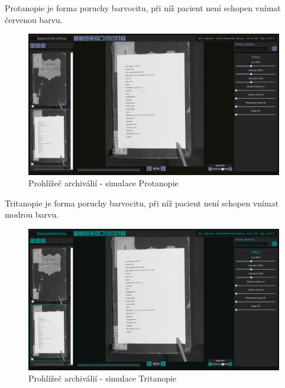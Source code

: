 \newpage
\noindent
Protanopie je forma poruchy barvocitu, při níž pacient není schopen vnímat červenou barvu.
\begin{figure}[htbp]
\centering
    \includegraphics[scale=.35]{obrazky-figures/testing/figma-eye-defects/Gallery Page - Protanopia.png}
    \caption{Prohlížeč archiválií - simulace Protanopie}
\end{figure}

\noindent
Tritanopie je forma poruchy barvocitu, při níž pacient není schopen vnímat modrou barvu.
\begin{figure}[htbp]
\centering
    \includegraphics[scale=.35]{obrazky-figures/testing/figma-eye-defects/Gallery Page - Tritanopia.png}
    \caption{Prohlížeč archiválií - simulace Tritanopie}
\end{figure}

